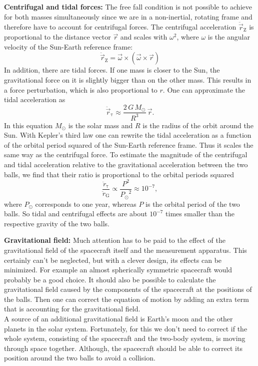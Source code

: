 \documentclass[]{rsos}
\begin{document}
\textbf{Centrifugal and tidal forces:}
\label{sec:tidal}
The free fall condition is not possible to achieve for both masses simultaneously since we are in a non-inertial, rotating frame and therefore have to account for centrifugal forces. The centrifugal acceleration $\ddot{\vec{r}}_{\mathrm{Z}}$ is proportional to the distance vector $\vec{r}$ and scales with $\omega^2$, where $\omega$ is the angular velocity of the Sun-Earth reference frame:
\begin{equation}
\label{eq:centrifugalacc}
\ddot{\vec{r}}_{\mathrm{Z}} = \vec{\omega} \times \left( \vec{\omega} \times \vec{r} \right) 
\end{equation}
In addition, there are tidal forces. If one mass is closer to the Sun, the gravitational force on it is slightly bigger than on the other mass. This results in a force perturbation, which is also proportional to $r$. One can approximate the tidal acceleration as
\begin{equation}
\label{eq:tidalacc}
\ddot{\vec{r}}_{\mathrm{\tau}} \approx \frac{2 \, G \, M_\odot}{R^3} \, \vec{r}.
\end{equation}
In this equation $M_\odot$ is the solar mass and $R$ is the radius of the orbit around the Sun. With Kepler's third law one can rewrite the tidal acceleration as a function of the orbital period squared of the Sun-Earth reference frame. Thus it scales the same way as the centrifugal force. To estimate the magnitude of the centrifugal and tidal acceleration relative to the gravitational acceleration between the two balls, we find that their ratio is proportional to the orbital periods squared
\begin{equation}\label{a_ratio}
\frac{\ddot{r}_{\mathrm{\tau}}}{\ddot{r}_\mathrm{G}} \propto \frac{P^2}{{P_\odot}^2} \approx 10^{-7},
\end{equation}
where $P_\odot$ corresponds to one year, whereas $P$ is the orbital period of the two balls. So tidal and centrifugal effects are about $10^{-7}$ times smaller than the respective gravity of the two balls.

\textbf{Gravitational field:}
Much attention has to be paid to the effect of the gravitational field of the spacecraft itself and the measurement apparatus. This certainly can't be neglected, but with a clever design, its effects can be minimized. For example an almost spherically symmetric spacecraft would probably be a good choice. It should also be possible to calculate the gravitational field caused by the components of the spacecraft at the positions of the balls. Then one can correct the equation of motion by adding an extra term that is accounting for the gravitational field. \\
A source of an additional gravitational field is Earth's moon and the other planets in the solar system. Fortunately, for this we don't need to correct if the whole system, consisting of the spacecraft and the two-body system, is moving through space together. Although, the spacecraft should be able to correct its position around the two balls to avoid a collision.
\end{document}
